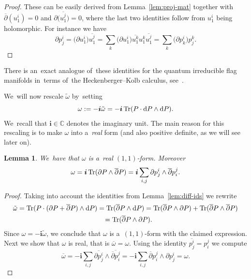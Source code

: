 \documentclass[10pt,a4paper]{amsart}
\numberwithin{equation}{section}
\newtheorem{Lemma}[Theorem]{Lemma}
\newcommand{\diff}{\mathrm{d}}
\newcommand{\del}{\partial}
\newcommand{\delbar}{\overline{\partial}}
\newcommand{\bbC}{\mathbb{C}}
\newcommand{\iu}{\boldsymbol{i}}
\newcommand{\kafo}{\omega}
\newcommand{\kafot}{\tilde{\omega}}
\begin{document}
\begin{proof}
These can be easily derived from Lemma~\ref{lem:proj-mat} together with $\delbar(u^i_1) = 0$ and $\del\big(\overline{u^j_1}\big) = 0$, where the last two identities follow from $u^i_1$ being holomorphic. For instance we have
\[
\del p^i_j = \big(\del u^i_1\big) \overline{u^j_1} = \sum_k \big(\del u^i_1\big) \overline{u^k_1} u^k_1 \overline{u^j_1}
= \sum_k \big(\del p^i_k\big) p^k_j. \tag*{\qed}
\]
\renewcommand{\qed}{}
\end{proof}

\begin{Remark}
There is an~exact analogue of~these identities for the quantum irreducible flag manifolds in~terms of~the Heckenberger--Kolb calculus, see~\cite[Lemma 5.2]{mat-kahler}.
\end{Remark}

We~will now rescale $\kafot$ by~setting
\begin{equation}
\label{eq:kahler-form}
\kafo := - \iu \kafot = - \iu \mathop{\rm Tr}(P \cdot \diff P \wedge \diff P).
\end{equation}
We~recall that $\iu \in \bbC$ denotes the imaginary unit. The main reason for this rescaling is to make $\kafo$ into a~\emph{real} form (and also positive definite, as we will see later on).

\begin{Lemma}
We~have that $\kafo$ is a~real $(1, 1)$-form. Moreover
\[
\kafo = \iu \mathop{\rm Tr}(\del P \wedge \delbar P) = \iu \sum_{i, j} \del p^i_j \wedge \delbar p^j_i.
\]
\end{Lemma}

\begin{proof}
Taking into account the identities from Lemma~\ref{lem:diff-ids} we rewrite
\begin{gather*}
\kafot = \mathop{\rm Tr}(P \cdot (\del P + \delbar P) \wedge \diff P) = \mathop{\rm Tr}(\delbar P \wedge \diff P) = \mathop{\rm Tr}(\delbar P \wedge \del P) + \mathop{\rm Tr}(\delbar P \wedge \delbar P) \\ \phantom{\kafot}
{} = \mathop{\rm Tr}(\delbar P \wedge \del P).
\end{gather*}
Since $\kafo = - \iu \kafot$, we conclude that $\kafo$ is a~$(1, 1)$-form with the claimed expression.
Next we show that $\kafo$ is real, that is $\overline{\kafo} = \kafo$.
Using the identity $\overline{p^i_j} = p^j_i$ we compute
\[
\overline{\kafo} = - \iu \sum_{i, j} \overline{\del p^i_j} \wedge \overline{\delbar p^j_i}
= - \iu \sum_{i, j} \delbar p^j_i \wedge \del p^i_j = \kafo. \tag*{\qed}
\]
\renewcommand{\qed}{}
\end{proof}
\end{document}

